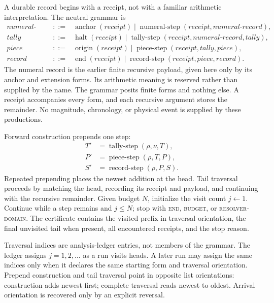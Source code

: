 A durable record begins with a receipt, not with a familiar arithmetic interpretation.  The neutral grammar is
\[
\begin{array}{rcl}
\textit{numeral-record}&::=&\operatorname{anchor}(\textit{receipt})
 \mid\operatorname{numeral\mbox{-}step}(\textit{receipt},\textit{numeral-record}),\\
\textit{tally}&::=&\operatorname{halt}(\textit{receipt})
 \mid\operatorname{tally\mbox{-}step}(\textit{receipt},\textit{numeral-record},\textit{tally}),\\
\textit{piece}&::=&\operatorname{origin}(\textit{receipt})
 \mid\operatorname{piece\mbox{-}step}(\textit{receipt},\textit{tally},\textit{piece}),\\
\textit{record}&::=&\operatorname{end}(\textit{receipt})
 \mid\operatorname{record\mbox{-}step}(\textit{receipt},\textit{piece},\textit{record}).
\end{array}
\]
The numeral record is the earlier finite recursive payload, given here only by its anchor and extension forms.  Its
arithmetic meaning is reserved rather than supplied by the name.  The grammar posits finite forms and nothing else.  A
receipt accompanies every form, and each recursive argument stores the remainder.  No magnitude, chronology, or
physical event is supplied by these productions.

Forward construction prepends one step:
\[
\begin{aligned}
T'&=\operatorname{tally\mbox{-}step}(\rho,\nu,T),\\
P'&=\operatorname{piece\mbox{-}step}(\rho,T,P),\\
S'&=\operatorname{record\mbox{-}step}(\rho,P,S).
\end{aligned}
\]
Repeated prepending places the newest addition at the head.  Tail traversal proceeds by matching the head, recording
its receipt and payload, and continuing with the recursive remainder.  Given budget \(N\), initialize the visit count
\(j\leftarrow1\).  Continue while a step remains and \(j\le N\); stop with \textsc{end}, \textsc{budget}, or
\textsc{resolver-domain}.  The certificate contains the visited prefix in traversal orientation, the final unvisited
tail when present, all encountered receipts, and the stop reason.

Traversal indices are analysis-ledger entries, not members of the grammar.  The ledger assigns \(j=1,2,\ldots\) as a
run visits heads.  A later run may assign the same indices only when it declares the same starting form and traversal
orientation.  Prepend construction and tail traversal point in opposite list orientations: construction adds newest
first; complete traversal reads newest to oldest.  Arrival orientation is recovered only by an explicit reversal.


